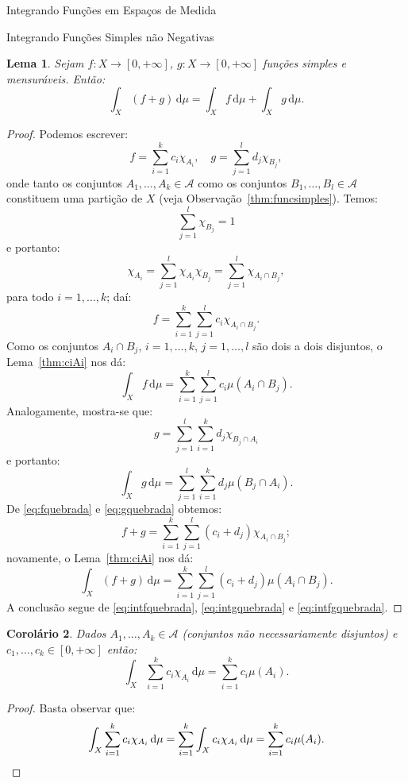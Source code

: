\documentclass[oneside,final,11pt]{amsbook}
\newcommand{\dd}{\mathrm d}
\theoremstyle{remark}\newtheorem{exercise}{Exercício}[chapter]
\theoremstyle{remark}\newtheorem{*exercise}[exercise]{\hbox to 0pt{\hskip 0pt minus 1fil*}Exercício}
\theoremstyle{definition}\newtheorem{exdefin}{Definição}[chapter]
\theoremstyle{plain}\newtheorem{teo}{Teorema}[section]
\theoremstyle{plain}\newtheorem{lem}[teo]{Lema}
\theoremstyle{plain}\newtheorem{prop}[teo]{Proposição}
\theoremstyle{plain}\newtheorem{cor}[teo]{Corolário}
\theoremstyle{definition}\newtheorem{defin}[teo]{Definição}
\theoremstyle{remark}\newtheorem{rem}[teo]{Observação}
\theoremstyle{definition}\newtheorem{notation}[teo]{Notação}
\theoremstyle{definition}\newtheorem{convention}[teo]{Convenção}
\theoremstyle{definition}\newtheorem{example}[teo]{Exemplo}
\numberwithin{section}{chapter}
\numberwithin{equation}{section}
\begin{document}
\begin{chapter}{Integrando Funções em Espaços de Medida}
\begin{section}{Integrando Funções Simples não Negativas}
\begin{lem}\label{thm:intsomasimples}
Sejam $f:X\to[0,+\infty]$, $g:X\to[0,+\infty]$ funções simples e mensuráveis. Então:
\[\int_X(f+g)\,\dd\mu=\int_Xf\,\dd\mu+\int_Xg\,\dd\mu.\]
\end{lem}
\begin{proof}
Podemos escrever:
\[f=\sum_{i=1}^kc_i\chi_{A_i},\quad g=\sum_{j=1}^ld_j\chi_{B_j},\]
onde tanto os conjuntos $A_1,\ldots,A_k\in\mathcal A$ como os conjuntos $B_1,\ldots,B_l\in\mathcal A$
constituem uma partição de $X$ (veja Observação~\ref{thm:funcsimples}).
Temos:
\[\sum_{j=1}^l\chi_{B_j}=1\]
e portanto:
\[\chi_{A_i}=\sum_{j=1}^l\chi_{A_i}\chi_{B_j}=\sum_{j=1}^l\chi_{A_i\cap B_j},\]
para todo $i=1,\ldots,k$; daí:
\begin{equation}\label{eq:fquebrada}
f=\sum_{i=1}^k\sum_{j=1}^lc_i\chi_{A_i\cap B_j}.
\end{equation}
Como os conjuntos $A_i\cap B_j$, $i=1,\ldots,k$, $j=1,\ldots,l$ são dois a dois disjuntos,
o Lema~\ref{thm:ciAi} nos dá:
\begin{equation}\label{eq:intfquebrada}
\int_Xf\,\dd\mu=\sum_{i=1}^k\sum_{j=1}^lc_i\mu(A_i\cap B_j).
\end{equation}
Analogamente, mostra-se que:
\begin{equation}\label{eq:gquebrada}
g=\sum_{j=1}^l\sum_{i=1}^kd_j\chi_{B_j\cap A_i}
\end{equation}
e portanto:
\begin{equation}\label{eq:intgquebrada}
\int_Xg\,\dd\mu=\sum_{j=1}^l\sum_{i=1}^kd_j\mu(B_j\cap A_i).
\end{equation}
De \eqref{eq:fquebrada} e \eqref{eq:gquebrada} obtemos:
\[f+g=\sum_{i=1}^k\sum_{j=1}^l(c_i+d_j)\chi_{A_i\cap B_j};\]
novamente, o Lema~\ref{thm:ciAi} nos dá:
\begin{equation}\label{eq:intfgquebrada}
\int_X(f+g)\,\dd\mu=\sum_{i=1}^k\sum_{j=1}^l(c_i+d_j)\mu(A_i\cap B_j).
\end{equation}
A conclusão segue de \eqref{eq:intfquebrada}, \eqref{eq:intgquebrada} e \eqref{eq:intfgquebrada}.
\end{proof}

\begin{cor}
Dados $A_1,\ldots,A_k\in\mathcal A$ (conjuntos não necessariamente disjuntos)
e $c_1,\ldots,c_k\in[0,+\infty]$ então:
\[\int_X\sum_{i=1}^kc_i\chi_{A_i}\,\dd\mu=\sum_{i=1}^kc_i\mu(A_i).\]
\end{cor}
\begin{proof}
Basta observar que:
\[\int_X\sum_{i=1}^kc_i\chi_{A_i}\,\dd\mu=\sum_{i=1}^k\int_Xc_i\chi_{A_i}\,\dd\mu
=\sum_{i=1}^kc_i\mu(A_i).\qedhere\]
\end{proof}


\end{section}
\end{chapter}
\end{document}
